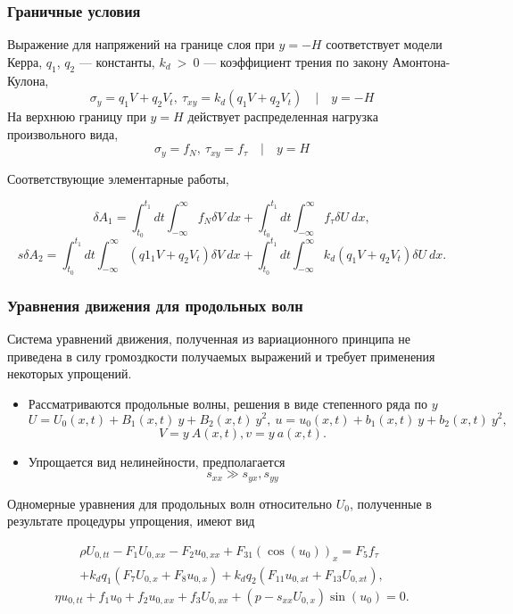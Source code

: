 \begin{frame}
\frametitle{Граничные условия}
	
	Выражение для напряжений на границе слоя при $y=-H$ соответствует модели Керра\footnotemark, $q_1$, $q_2$ --- константы, $k_d ~> ~0$ --- коэффициент трения по закону Амонтона-Кулона,
	$$
		\sigma_{y}=q_1 V + q_2 V_t , ~
		\tau_{xy}= k_d (q_1 V + q_2 V_t) \quad | \quad y = -H
	$$
	На верхнюю границу при $y=H$ действует распределенная нагрузка произвольного вида,
	$$
		\sigma_{y}=f_{N}, ~\tau_{xy}=f_{\tau} \quad | \quad y = H
	$$
	
	Соответствующие элементарные работы,
	\begin{small}
	$$
		\delta A_1 =  \int_{t_0}^{t_1} dt\int_{-\infty}^{\infty}f_{N}\delta V \:  dx +\int_{t_0}^{t_1} dt  
		\int_{-\infty}^{\infty} f_{\tau}\delta U \: dx ,
	$$
	$$s
		\delta A_2 =  \int_{t_0}^{t_1} dt \int_{-\infty}^{\infty}(q1_1 V + q_2 V_t)\delta V \:  dx + \int_{t_0}^{t_1} dt
		\int_{-\infty}^{\infty}k_d(q_1 V + q_2 V_t)\delta U \:  dx. 
	$$
	\end{small}

\end{frame}

\begin{frame}
\frametitle{Уравнения движения для продольных волн}
\begin{small}	
	Система уравнений движения, полученная из вариационного принципа не приведена в силу громоздкости получаемых выражений и требует применения некоторых упрощений.
	
\begin{itemize}
	\item { Рассматриваются продольные волны, решения в виде степенного ряда по $y$
		\small{
		$$
			U=U_0(x,t)+B_1(x,t)~y+B_2(x,t)~y^2,~u=u_0(x,t)+b_1(x,t)~y+b_2(x,t)~y^2, \label{Usol}
		$$
		$$
			V=y~A(x,t), v=y~a(x,t). \label{Vsol}
		$$
		}
	}
	\item {Упрощается вид нелинейности, предполагается
		$$
		s_{xx} \gg s_{yx}, s_{yy}
		$$
	}
\end{itemize}
	
	Одномерные уравнения для продольных волн относительно $U_0$, полученные в результате процедуры упрощения, имеют вид
\begin{small}
\begin{multline}
	\rho U_{0,tt}-F_1 U_{0,xx}-F_2 u_{0,xx}+F_{31} \left(\cos(u_0)\right)_x = F_5 f_\tau\\
	+ k_d q_1 \left(F_7 U_{0,x}+F_8 u_{0,x}\right)+k_d q_2 \left(F_{11} u_{0,xt}+ F_{13} U_{0,xt}\right),
\end{multline}
\begin{equation}
	\eta u_{0,tt}+f_1 u_0+f_2 u_{0,xx}+f_3 U_{0,xx}+\left(p-s_{xx} U_{0,x}\right)\sin(u_0)=0.  
\end{equation}

\end{small}
\end{small}
\end{frame}

